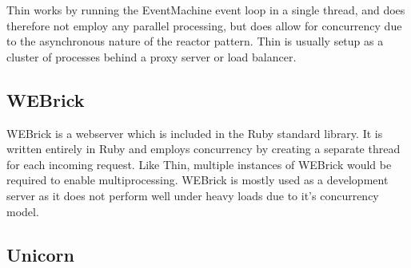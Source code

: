 Thin works by running the EventMachine event loop in a single thread, and
does therefore not employ any parallel processing, but does allow for
concurrency due to the asynchronous nature of the reactor pattern. Thin is
usually setup as a cluster of processes behind a proxy server or load
balancer.

\subsection{WEBrick}
WEBrick is a webserver which is included in the Ruby standard library. It is
written entirely in Ruby and employs concurrency by creating a separate thread
for each incoming request. Like Thin, multiple instances of WEBrick would be
required to enable multiprocessing. WEBrick is mostly used as a development
server as it does not perform well under heavy loads due to it's concurrency
model.

\subsection{Unicorn}
